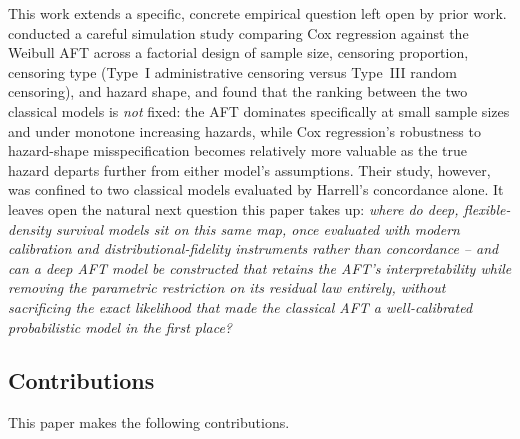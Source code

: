 \documentclass[11pt]{article}
\begin{document}
This work extends a specific, concrete empirical question left open by
prior work. \citet{opatha2024} conducted a careful simulation study
comparing Cox regression against the Weibull AFT across a factorial
design of sample size, censoring proportion, censoring type (Type~I
administrative censoring versus Type~III random censoring), and hazard
shape, and found that the ranking between the two classical models is
\emph{not} fixed: the AFT dominates specifically at small sample sizes
and under monotone increasing hazards, while Cox regression's robustness
to hazard-shape misspecification becomes relatively more valuable as the
true hazard departs further from either model's assumptions. Their study,
however, was confined to two classical models evaluated by Harrell's
concordance alone. It leaves open the natural next question this paper
takes up: \emph{where do deep, flexible-density survival models sit on
this same map, once evaluated with modern calibration and
distributional-fidelity instruments rather than concordance -- and can a
deep AFT model be constructed that retains the AFT's interpretability
while removing the parametric restriction on its residual law entirely,
without sacrificing the exact likelihood that made the classical AFT a
well-calibrated probabilistic model in the first place?}

\subsection{Contributions}
\label{sec:contributions}

This paper makes the following contributions.
\end{document}
